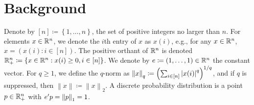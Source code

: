 \section{Background}

Denote by $[n]\coloneqq\left\{1,\ldots,n\right\}$, the set of positive integers no larger than $n$. For elements $x\in\mathbb{R}^{n}$, we denote the $i$th entry of $x$ as $x(i)$, e.g.,  
for any $x\in\mathbb{R}^{n}$, $x=(x(i):i\in[n])$.    
The positive orthant of $\mathbb{R}^n$ is denoted $\mathbb{R}_{+}^{n} \coloneqq \left\{x\in\mathbb{R}^{n}:x(i)\geq 0, i\in [n]\right\}$. 
We denote by $e\coloneqq (1,\ldots,1)\in\mathbb{R}^{n}$ the constant vector. 
For $q\geq 1$, we define the $q$-norm  as $\left\|x\right\|_q\coloneqq \left(\sum_{i\in[n]}\left|{x(i)}\right|^{q}\right)^{1/q}$, and if $q$ is suppressed, then $\left\|x\right\|\coloneqq \left\|x\right\|_2$. 
A discrete probability distribution is a point $p\in\mathbb{R}^{n}_+$ with $e'p=\left\|p\right\|_1=1$.

